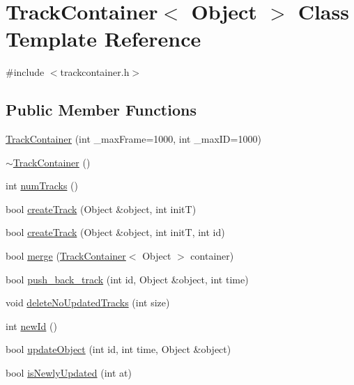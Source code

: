 \hypertarget{class_track_container}{\section{\-Track\-Container$<$ \-Object $>$ \-Class \-Template \-Reference}
\label{class_track_container}
}


{\ttfamily \#include $<$trackcontainer.\-h$>$}

\subsection*{\-Public \-Member \-Functions}
\begin{DoxyCompactItemize}
\item 
\hyperlink{class_track_container_aef7888400b7bd4130ac9d71000368a9f}{\-Track\-Container} (int \-\_\-max\-Frame=1000, int \-\_\-max\-I\-D=1000)
\item 
\hyperlink{class_track_container_a697aea5ba91b4a8e1976ec0d3797e0f9}{$\sim$\-Track\-Container} ()
\item 
int \hyperlink{class_track_container_a313d4a55a13eb7d65ccc00f63072c418}{num\-Tracks} ()
\item 
bool \hyperlink{class_track_container_a1e00485b32d80cf3f353f2dfc3e5b868}{create\-Track} (\-Object \&object, int init\-T)
\item 
bool \hyperlink{class_track_container_a072150f919ff475ad4e0fea05618e5c7}{create\-Track} (\-Object \&object, int init\-T, int id)
\item 
bool \hyperlink{class_track_container_afca485d474e3b55948328834f6a43b05}{merge} (\hyperlink{class_track_container}{\-Track\-Container}$<$ \-Object $>$ container)
\item 
bool \hyperlink{class_track_container_a71757dc5fdef41a5c8e1d7cdb8a23951}{push\-\_\-back\-\_\-track} (int id, \-Object \&object, int time)
\item 
void \hyperlink{class_track_container_a7e06bc8008da50d1ffcd606e0f9c81a2}{delete\-No\-Updated\-Tracks} (int size)
\item 
int \hyperlink{class_track_container_a7f6a8fcea307d5cc837a45dc5b02cc24}{new\-Id} ()
\item 
bool \hyperlink{class_track_container_ad2641dfc050b3ca32ffcd9701ca621e5}{update\-Object} (int id, int time, \-Object \&object)
\item 
bool \hyperlink{class_track_container_a7444d333183cc61c39847aa2f4e802dd}{is\-Newly\-Updated} (int at)
\end{DoxyCompactItemize}
